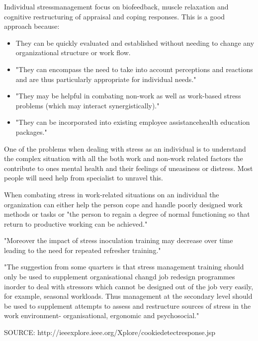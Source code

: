Individual stressmanagement focus on biofeedback, muscle relaxation and cognitive restructuring of appraisal and coping responses. This is a good approach because:

\begin{itemize}
\item They can be quickly evaluated and established without needing to change any organizational structure or work flow.
\item "They can encompass the need to take into account perceptions and reactions and are thus particularly appropriate for individual needs."
\item "They may be helpful in combating non-work as well as work-based stress problems (which may interact synergistically)."
\item "They can be incorporated into existing employee assistancehealth education packages."
\end{itemize}

One of the problems when dealing with stress as an individual is to understand the complex situation with all the both work and non-work related factors the contribute to ones mental health and their feelings of uneasiness or distress. Most people will need help from specialist to unravel this.

When combating stress in work-related situations on an individual the organization can either help the person cope and handle poorly designed work methods or tasks or "the person to regain a degree of normal functioning so that return to productive working can be achieved."

"Moreover the impact of stress inoculation training may decrease over time leading to the need for repeated refresher training."

"The suggestion from some quarters is that stress management training should only be used to supplement organisational changd job redesign programmes inorder to deal with stressors which cannot be designed out of the job very easily, for example, seasonal workloads. Thus management at the secondary level should be used to supplement attempts to assess and restructure sources of stress in the work environment- organisational, ergonomic and psychosocial."


SOURCE: http://ieeexplore.ieee.org/Xplore/cookiedetectresponse.jsp
